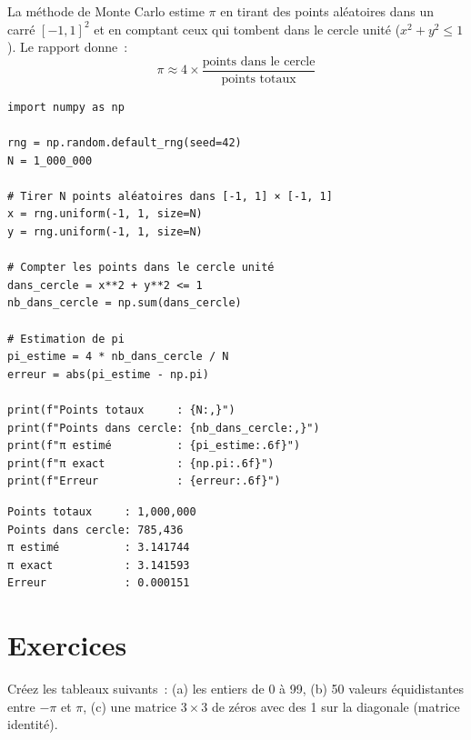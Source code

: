 \begin{projet}
La m\'ethode de Monte Carlo estime $\pi$ en tirant des points
al\'eatoires dans un carr\'e $[-1, 1]^2$ et en comptant ceux qui tombent dans le
cercle unit\'e ($x^2 + y^2 \leq 1$). Le rapport donne~:
\[
    \pi \approx 4 \times \frac{\text{points dans le cercle}}{\text{points totaux}}
\]
\end{projet}

\begin{codeblock}[title=\textbf{Python}]
\begin{verbatim}
import numpy as np

rng = np.random.default_rng(seed=42)
N = 1_000_000

# Tirer N points aléatoires dans [-1, 1] × [-1, 1]
x = rng.uniform(-1, 1, size=N)
y = rng.uniform(-1, 1, size=N)

# Compter les points dans le cercle unité
dans_cercle = x**2 + y**2 <= 1
nb_dans_cercle = np.sum(dans_cercle)

# Estimation de pi
pi_estime = 4 * nb_dans_cercle / N
erreur = abs(pi_estime - np.pi)

print(f"Points totaux     : {N:,}")
print(f"Points dans cercle: {nb_dans_cercle:,}")
print(f"π estimé          : {pi_estime:.6f}")
print(f"π exact           : {np.pi:.6f}")
print(f"Erreur            : {erreur:.6f}")
\end{verbatim}
\end{codeblock}

\begin{codeoutput}
\begin{verbatim}
Points totaux     : 1,000,000
Points dans cercle: 785,436
π estimé          : 3.141744
π exact           : 3.141593
Erreur            : 0.000151
\end{verbatim}
\end{codeoutput}

\section{Exercices}

\begin{exercice}
Cr\'eez les tableaux suivants~: (a) les entiers de 0 \`a 99, (b) 50 valeurs
\'equidistantes entre $-\pi$ et $\pi$, (c) une matrice $3\times 3$ de z\'eros
avec des 1 sur la diagonale (matrice identit\'e).
\end{exercice}

